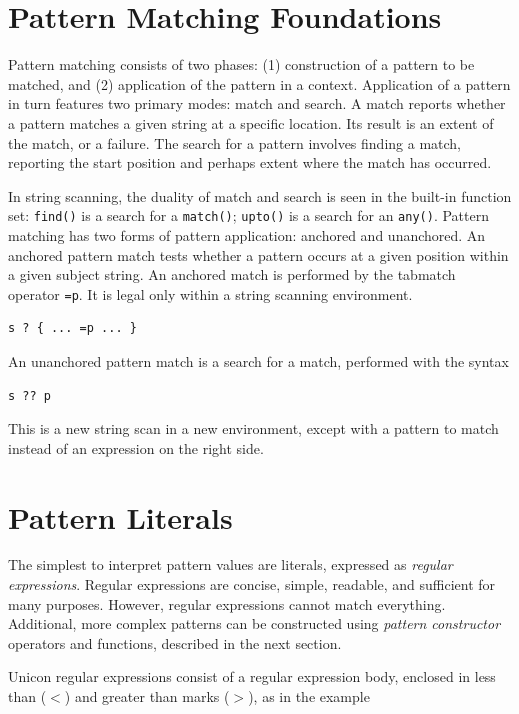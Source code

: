 \documentclass[letterpaper,12pt]{article}
\begin{document}
\section{Pattern Matching Foundations}

Pattern matching consists of two phases: (1) construction of a
pattern to be matched, and (2) application of the pattern in a context.
Application of a pattern in turn features two primary modes: match
and search. A match reports whether a pattern matches a given string
at a specific location.  Its result is an extent of the match, or a
failure. The search for a pattern involves finding a match, reporting
the start position and perhaps extent where the match has occurred.

In string scanning, the duality of match and search is seen in the
built-in function set: {\tt find()} is a search for a {\tt match()};
{\tt upto()} is a search for an {\tt any()}. Pattern matching has
two forms of pattern
application: anchored and unanchored. An anchored pattern match tests
whether a pattern occurs at a given position within a given subject
string. An anchored match is performed by the tabmatch operator {\tt =p}.
It is legal only within a string scanning environment.

\begin{verbatim}
s ? { ... =p ... }
\end{verbatim}

An unanchored pattern match is a search for a match, performed with
the syntax

\begin{verbatim}
s ?? p
\end{verbatim}

\noindent This is a new string scan in a new environment, except with
a pattern to match instead of an expression on the right side.


\section{Pattern Literals}

The simplest to interpret pattern values are literals, expressed as
{\em regular expressions\/}. Regular expressions are concise, simple,
readable, and sufficient for many purposes.
However, regular expressions cannot match
everything. Additional, more complex patterns can be constructed using
{\em pattern constructor\/} operators and functions, described in the
next section.

Unicon regular expressions consist of a regular expression body,
enclosed in less than ({\tt $<$}) and greater than marks ({\tt $>$}),
as in the example
\end{document}
